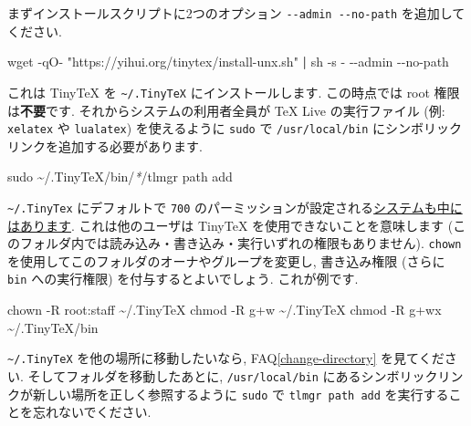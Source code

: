 \documentclass[
  xelatex,ja=standard,jafont=noto]{bxjsreport}
\newenvironment{Shaded}{\begin{snugshade}}{\end{snugshade}}
\newcommand{\AttributeTok}[1]{\textcolor[rgb]{0.77,0.63,0.00}{#1}}
\newcommand{\FunctionTok}[1]{\textcolor[rgb]{0.00,0.00,0.00}{#1}}
\newcommand{\KeywordTok}[1]{\textcolor[rgb]{0.13,0.29,0.53}{\textbf{#1}}}
\newcommand{\NormalTok}[1]{#1}
\newcommand{\PreprocessorTok}[1]{\textcolor[rgb]{0.56,0.35,0.01}{\textit{#1}}}
\newcommand{\StringTok}[1]{\textcolor[rgb]{0.31,0.60,0.02}{#1}}
\begin{document}
まずインストールスクリプトに2つのオプション
\texttt{-\/-admin\ -\/-no-path} を追加してください.

\begin{Shaded}
\begin{Highlighting}[]
\FunctionTok{wget} \AttributeTok{{-}qO{-}} \StringTok{"https://yihui.org/tinytex/install{-}unx.sh"} \KeywordTok{|} \FunctionTok{sh} \AttributeTok{{-}s} \AttributeTok{{-}} \AttributeTok{{-}{-}admin} \AttributeTok{{-}{-}no{-}path}
\end{Highlighting}
\end{Shaded}

これは TinyTeX を \texttt{\textasciitilde{}/.TinyTeX}
にインストールします. この時点では root 権限は\textbf{不要}です.
それからシステムの利用者全員が TeX Live の実行ファイル (例:
\texttt{xelatex} や \texttt{lualatex}) を使えるように \texttt{sudo} で
\texttt{/usr/local/bin} にシンボリックリンクを追加する必要があります.

\begin{Shaded}
\begin{Highlighting}[]
\FunctionTok{sudo}\NormalTok{ \textasciitilde{}/.TinyTeX/bin/}\PreprocessorTok{*}\NormalTok{/tlmgr path add}
\end{Highlighting}
\end{Shaded}

\texttt{\textasciitilde{}/.TinyTex} にデフォルトで \texttt{700}
のパーミッションが設定される\href{https://github.com/yihui/tinytex/issues/37}{システムも中にはあります}.
これは他のユーザは TinyTeX を使用できないことを意味します
(このフォルダ内では読み込み・書き込み・実行いずれの権限もありません).
\texttt{chown} を使用してこのフォルダのオーナやグループを変更し,
書き込み権限 (さらに \texttt{bin} への実行権限)
を付与するとよいでしょう. これが例です.

\begin{Shaded}
\begin{Highlighting}[]
\FunctionTok{chown} \AttributeTok{{-}R}\NormalTok{ root:staff \textasciitilde{}/.TinyTeX}
\FunctionTok{chmod} \AttributeTok{{-}R}\NormalTok{ g+w \textasciitilde{}/.TinyTeX}
\FunctionTok{chmod} \AttributeTok{{-}R}\NormalTok{ g+wx \textasciitilde{}/.TinyTeX/bin}
\end{Highlighting}
\end{Shaded}

\texttt{\textasciitilde{}/.TinyTeX} を他の場所に移動したいなら,
FAQ\ref{change-directory} を見てください.
そしてフォルダを移動したあとに, \texttt{/usr/local/bin}
にあるシンボリックリンクが新しい場所を正しく参照するように \texttt{sudo}
で \texttt{tlmgr\ path\ add} を実行することを忘れないでください.
\end{document}
